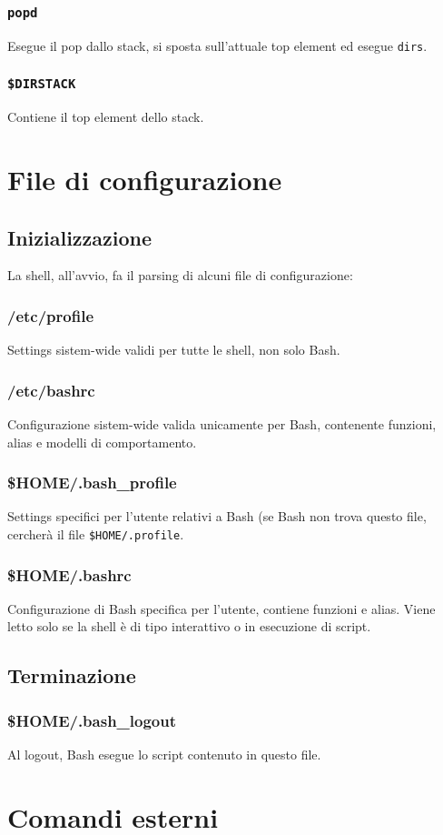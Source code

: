 \subsubsection*{\texttt{popd}}
Esegue il pop dallo stack, si sposta sull'attuale top element ed esegue
\texttt{dirs}.

\subsubsection*{\texttt{\$DIRSTACK}}
Contiene il top element dello stack.

\section{File di configurazione}
\subsection{Inizializzazione}
La shell, all'avvio, fa il parsing di alcuni file di configurazione:

\subsubsection*{/etc/profile}
Settings sistem-wide validi per tutte le shell, non solo Bash.

\subsubsection*{/etc/bashrc}
Configurazione sistem-wide valida unicamente per Bash, contenente funzioni,
alias e modelli di comportamento.

\subsubsection*{\$HOME/.bash\_profile}
Settings specifici per l'utente relativi a Bash (se Bash non trova questo
file, cercher\`a il file \texttt{\$HOME/.profile}.

\subsubsection*{\$HOME/.bashrc}
Configurazione di Bash specifica per l'utente, contiene funzioni e alias.
Viene letto solo se la shell \`e di tipo interattivo o in esecuzione di
script.

\subsection{Terminazione}
\subsubsection*{\$HOME/.bash\_logout}
Al logout, Bash esegue lo script contenuto in questo file.

\section{Comandi esterni}

